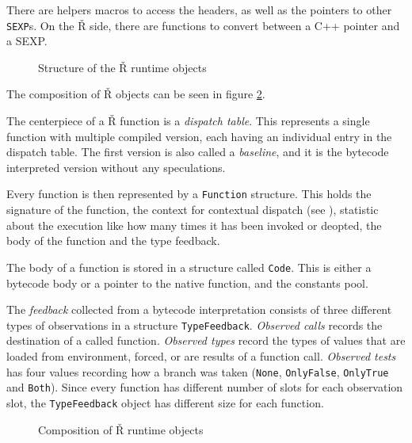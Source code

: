 There are helpers macros to access the headers, as well as the pointers to other \texttt{SEXP}s. On the Ř side, there are functions to convert between a C++ pointer and a SEXP.

\begin{figure}
	\centering
	\begin{adjustbox}{trim=10 80pt 0 0, clip}
	\end{adjustbox}
	\caption{Structure of the Ř runtime objects}\label{fig:rsh-object-struct}
\end{figure}

The composition of Ř objects can be seen in figure \ref{fig:rsh-composition}.

The centerpiece of a Ř function is a \textit{dispatch table}. This represents a single function with multiple compiled version, each having an individual entry in the dispatch table. The first version is also called a \textit{baseline}, and it is the bytecode interpreted version without any speculations.

Every function is then represented by a \texttt{Function} structure. This holds the signature of the function, the context for contextual dispatch (see ), statistic about the execution like how many times it has been invoked or deopted, the body of the function and the type feedback.

The body of a function is stored in a structure called \texttt{Code}. This is either a bytecode body or a pointer to the native function, and the constants pool.

The \textit{feedback} collected from a bytecode interpretation consists of three different types of observations in a structure \texttt{TypeFeedback}. \textit{Observed calls} records the destination of  a called function. \textit{Observed types} record the types of values that are loaded from environment, forced, or are results of a function call. \textit{Observed tests} has four values recording how a branch was taken (\texttt{None}, \texttt{OnlyFalse}, \texttt{OnlyTrue} and \texttt{Both}). Since every function has different number of slots for each observation slot, the \texttt{TypeFeedback} object has different size for each function. 

\begin{figure}
	\centering
	\caption{Composition of Ř runtime objects}\label{fig:rsh-composition}
\end{figure}

